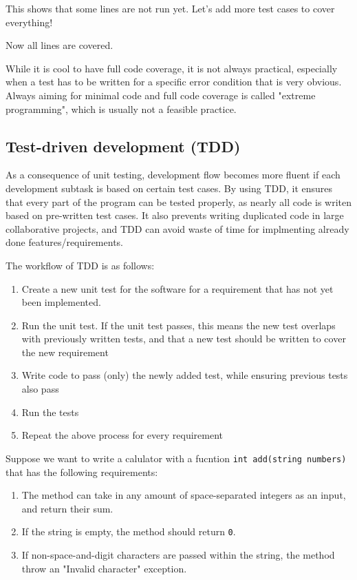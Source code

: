 This shows that some lines are not run yet. Let's add more test cases to cover everything!


Now all lines are covered.

While it is cool to have full code coverage, it is not always practical,
especially when a test has to be written for a specific error condition that is very obvious.
Always aiming for minimal code and full code coverage is called "extreme programming", which is usually not a feasible practice.

\subsection{Test-driven development (TDD)}
As a consequence of unit testing, development flow becomes more fluent if each development subtask is based on certain test cases. By using TDD, it ensures that every part of the program can be tested properly, as nearly all code is writen based on pre-written test cases. It also prevents writing duplicated code in large collaborative projects, and TDD can avoid waste of time for implmenting already done features/requirements. 

The workflow of TDD is as follows:

\begin{enumerate}
	\item Create a new unit test for the software for a requirement that has not yet been implemented. 
	\item Run the unit test. If the unit test passes, this means the new test overlaps with previously written tests, and that a new test should be written to cover the new requirement
	\item Write code to pass (only) the newly added test, while ensuring previous tests also pass
	\item Run the tests
	\item Repeat the above process for every requirement
\end{enumerate}

Suppose we want to write a calulator with a fucntion \texttt{int add(string numbers)} that has the following requirements:

\begin{enumerate}
	\item The method can take in any amount of space-separated integers as an input, and return their sum.
	\item If the string is empty, the method should return \texttt{0}.
	\item If non-space-and-digit characters are passed within the string, the method throw an "Invalid character" exception. 
\end{enumerate}

